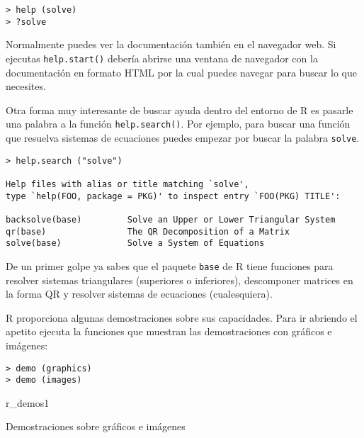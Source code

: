 \begin{verbatim}
> help (solve)
> ?solve 
\end{verbatim}

Normalmente  puedes  ver  la  documentación también  en  el  navegador
web. Si  ejecutas {\tt  help.start()} debería  abrirse una  ventana de
navegador  con la  documentación en  formato HTML  por la  cual puedes
navegar para buscar lo que necesites.

Otra forma muy interesante de buscar  ayuda dentro del entorno de {\sf
R}  es pasarle  una  palabra  a la  función  {\tt help.search()}.  Por
ejemplo, para buscar  una función que resuelva  sistemas de ecuaciones
puedes empezar por buscar la palabra {\tt solve}.


\begin{verbatim}
> help.search ("solve")

Help files with alias or title matching `solve',
type `help(FOO, package = PKG)' to inspect entry `FOO(PKG) TITLE':

backsolve(base)         Solve an Upper or Lower Triangular System
qr(base)                The QR Decomposition of a Matrix
solve(base)             Solve a System of Equations
\end{verbatim}

De un  primer golpe  ya sabes  que el  paquete {\tt  base} de  {\sf R}
tiene  funciones para  resolver  sistemas  triangulares (superiores  o
inferiores), descomponer matrices  en la forma QR  y resolver sistemas
de ecuaciones (cualesquiera).

{\sf  R} proporciona  algunas  demostraciones  sobre sus  capacidades.
Para  ir abriendo  el apetito  ejecuta la  funciones que  muestran las
demostraciones con gráficos e imágenes:

\begin{verbatim}
> demo (graphics)
> demo (images)
\end{verbatim}


\begin{figura}{r_demos}{1}
\caption{Demostraciones sobre gráficos e imágenes}
\end{figura}


